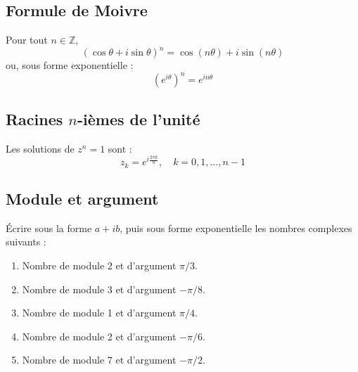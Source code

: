 \subsection*{Formule de Moivre}

Pour tout $n \in \mathbb{Z}$,
\[
\left(\cos\theta + i\sin\theta\right)^n = \cos(n\theta) + i\sin(n\theta)
\]
ou, sous forme exponentielle :
\[
\left(e^{i\theta}\right)^n = e^{in\theta}
\]

\subsection*{Racines $n$-ièmes de l'unité}

Les solutions de $z^n = 1$ sont :
\[
z_k = e^{i\frac{2\pi k}{n}},\quad k = 0, 1, \ldots, n-1
\]



\vspace{3em}

\subsection{Module et argument}

Écrire sous la forme $a+i b$, puis sous forme exponentielle les nombres complexes suivants :
\begin{enumerate}
\item Nombre de module 2 et d'argument $\pi / 3$.
\item Nombre de module 3 et d'argument $-\pi / 8$.
\item Nombre de module 1 et d'argument $\pi / 4$.
\item Nombre de module 2 et d'argument $-\pi / 6$.
\item Nombre de module 7 et d'argument $-\pi / 2$.
\end{enumerate}

\vspace{2em}


